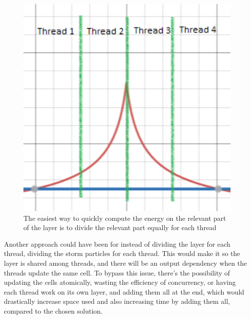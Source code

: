 \begin{figure}[h]
    \centering
    \includegraphics[scale=0.4]{images/Thread_separation.png}
    \caption{The easiest way to quickly compute the energy on the relevant part of the layer is to divide the relevant part equally for each thread}
    \label{fig:my_label}
\end{figure}

Another approach could have been for instead of dividing the layer for each thread, dividing the storm particles for each thread. This would make it so the layer is shared among threads, and there will be an output dependency when the threads update the same cell. To bypass this issue, there's the possibility of updating the cells atomically, wasting the efficiency of concurrency, or having each thread work on its own layer, and adding them all at the end, which would drastically increase space used and also increasing time by adding them all, compared to the chosen solution.



